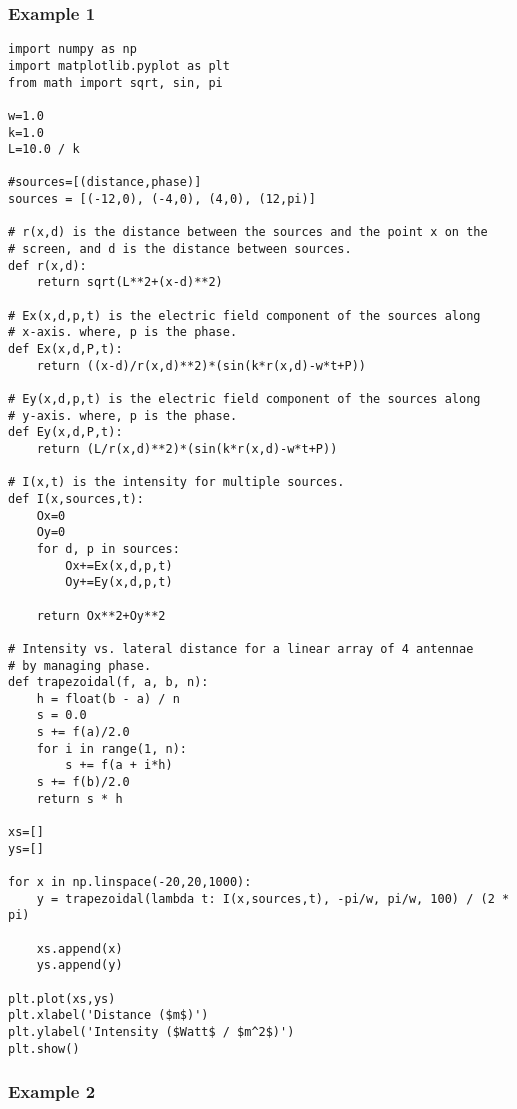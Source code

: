 \subsubsection{Example 1}\label{code:phase_right}

\begin{Verbatim}[fontsize=\small,baselinestretch=0.9]
import numpy as np
import matplotlib.pyplot as plt
from math import sqrt, sin, pi

w=1.0
k=1.0
L=10.0 / k

#sources=[(distance,phase)]
sources = [(-12,0), (-4,0), (4,0), (12,pi)]

# r(x,d) is the distance between the sources and the point x on the
# screen, and d is the distance between sources.
def r(x,d):
    return sqrt(L**2+(x-d)**2)
    
# Ex(x,d,p,t) is the electric field component of the sources along
# x-axis. where, p is the phase.
def Ex(x,d,P,t):
    return ((x-d)/r(x,d)**2)*(sin(k*r(x,d)-w*t+P))

# Ey(x,d,p,t) is the electric field component of the sources along
# y-axis. where, p is the phase.
def Ey(x,d,P,t):
    return (L/r(x,d)**2)*(sin(k*r(x,d)-w*t+P))
       
# I(x,t) is the intensity for multiple sources.
def I(x,sources,t):
    Ox=0
    Oy=0
    for d, p in sources:
        Ox+=Ex(x,d,p,t)
        Oy+=Ey(x,d,p,t)
    
    return Ox**2+Oy**2
        
# Intensity vs. lateral distance for a linear array of 4 antennae
# by managing phase.
def trapezoidal(f, a, b, n):
    h = float(b - a) / n
    s = 0.0
    s += f(a)/2.0
    for i in range(1, n):
        s += f(a + i*h)
    s += f(b)/2.0
    return s * h

xs=[]
ys=[]

for x in np.linspace(-20,20,1000):
    y = trapezoidal(lambda t: I(x,sources,t), -pi/w, pi/w, 100) / (2 * pi)
   
    xs.append(x)
    ys.append(y)

plt.plot(xs,ys)
plt.xlabel('Distance ($m$)')
plt.ylabel('Intensity ($Watt$ / $m^2$)')
plt.show()   
\end{Verbatim}


\subsubsection{Example 2}\label{code:phase_left}

